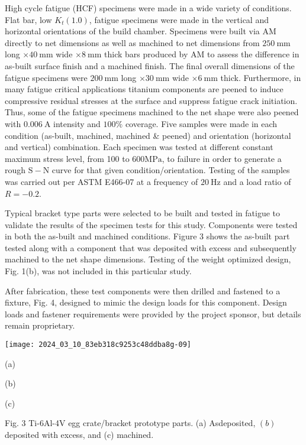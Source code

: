 \documentclass[10pt]{article}
\begin{document}
High cycle fatigue (HCF) specimens were made in a wide variety of conditions. Flat bar, low $K_{t}(1.0)$, fatigue specimens were made in the vertical and horizontal orientations of the build chamber. Specimens were built via AM directly to net dimensions as well as machined to net dimensions from $250 \mathrm{~mm}$ long $\times 40 \mathrm{~mm}$ wide $\times 8 \mathrm{~mm}$ thick bars produced by AM to assess the difference in as-built surface finish and a machined finish. The final overall dimensions of the fatigue specimens were $200 \mathrm{~mm}$ long $\times 30 \mathrm{~mm}$ wide $\times 6 \mathrm{~mm}$ thick. Furthermore, in many fatigue critical applications titanium components are peened to induce compressive residual stresses at the surface and suppress fatigue crack initiation. Thus, some of the fatigue specimens machined to the net shape were also peened with $0.006 \mathrm{~A}$ intensity and $100 \%$ coverage. Five samples were made in each condition (as-built, machined, machined \& peened) and orientation (horizontal and vertical) combination. Each specimen was tested at different constant maximum stress level, from 100 to $600 \mathrm{MPa}$, to failure in order to generate a rough $\mathrm{S}-\mathrm{N}$ curve for that given condition/orientation. Testing of the samples was carried out per ASTM E466-07 at a frequency of $20 \mathrm{~Hz}$ and a load ratio of $R=-0.2$.

Typical bracket type parts were selected to be built and tested in fatigue to validate the results of the specimen tests for this study. Components were tested in both the as-built and machined conditions. Figure 3 shows the as-built part tested along with a component that was deposited with excess and subsequently machined to the net shape dimensions. Testing of the weight optimized design, Fig. 1(b), was not included in this particular study.

After fabrication, these test components were then drilled and fastened to a fixture, Fig. 4, designed to mimic the design loads for this component. Design loads and fastener requirements were provided by the project sponsor, but details remain proprietary.

\begin{center}
\texttt{[image: 2024\_03\_10\_83eb318c9253c48ddba8g-09]}
\end{center}

(a)

(b)

(c)

Fig. 3 Ti-6Al-4V egg crate/bracket prototype parts. (a) Asdeposited, $(b)$ deposited with excess, and (c) machined.
\end{document}
